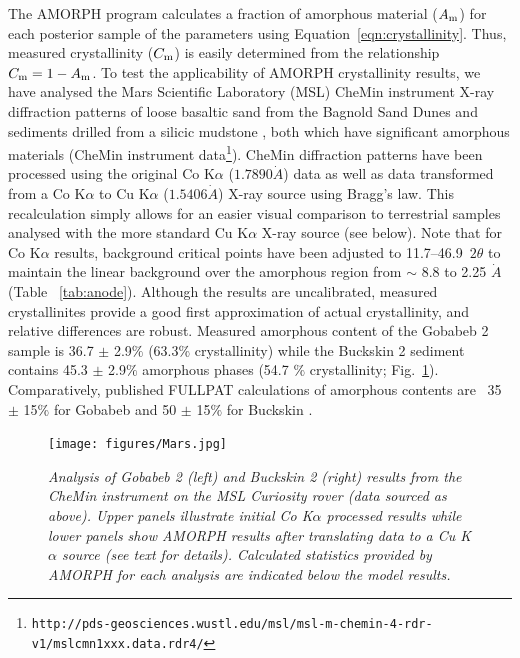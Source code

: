 \documentclass[review]{elsarticle}
\newcommand{\changed}{\color{blue}}
\begin{document}
The AMORPH program calculates a fraction of amorphous material ($A_{\rm m}$) for each posterior sample of the parameters
using Equation~\ref{eqn:crystallinity}. Thus, measured crystallinity ($C_{\rm m}$) is easily determined from the relationship $C_{\rm m} = 1-A_{\rm m}$.
{\changed To test the applicability of AMORPH crystallinity results, we have analysed the Mars Scientific Laboratory (MSL)  CheMin instrument X-ray diffraction patterns of loose basaltic sand from the Bagnold Sand Dunes \citep[Gobabeb;][]{achilles2017, lapotre2017}
and sediments drilled from a silicic mudstone \citep[Buckskin sample;][]{morris2016}, both which have significant amorphous
materials (CheMin instrument data\footnote{\tt http://pds-geosciences.wustl.edu/msl/msl-m-chemin-4-rdr-v1/mslcmn{\textunderscore}1xxx.data.rdr4/}). CheMin diffraction patterns have been processed using the original Co K$\alpha$ ($1.7890 \dot{A}$) data as well as data transformed from a Co K$\alpha$ to Cu K$\alpha$ ($1.5406 \dot{A}$) X-ray source using Bragg's law. This recalculation simply allows for an easier visual comparison to terrestrial samples analysed with the more standard Cu K$\alpha$ X-ray source (see below). Note that for Co K$\alpha$ results, background critical points have been adjusted to 11.7--46.9\degree~$2\theta$ to maintain the linear background over the amorphous region from $\sim$ 8.8 to 2.25 $\dot{A}$ (Table ~\ref{tab:anode}). Although the results are uncalibrated, measured crystallinites provide a good first approximation of actual crystallinity, and relative differences are robust. Measured amorphous content of the Gobabeb 2 sample is 36.7 $\pm$ 2.9$\%$ (63.3$\%$ crystallinity) while the Buckskin 2 sediment contains 45.3 $\pm$ 2.9$\%$ amorphous phases (54.7 $\%$ crystallinity; Fig.~\ref{fig:Mars}). Comparatively, published FULLPAT calculations of amorphous contents are ~35 $\pm$ 15$\%$ for Gobabeb and 50 $\pm$ 15$\%$ for Buckskin \citep{achilles2017, morris2016}. }

\begin{figure}[!ht]
\centering
\texttt{[image: figures/Mars.jpg]}
\caption{\it \changed Analysis of Gobabeb 2 (left) and Buckskin 2 (right) results from the CheMin instrument on the MSL Curiosity rover (data sourced as above). Upper panels  illustrate initial Co K$\alpha$ processed results while lower panels show AMORPH results after translating data to a Cu K$\alpha$ source (see text for details). Calculated statistics provided by AMORPH for each analysis are indicated below the model results.\label{fig:Mars}}
\end{figure}
\end{document}
